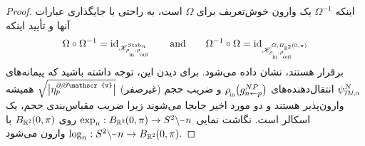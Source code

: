 \begin{proof}
    اینکه $\Omega^{-1}$ یک وارون خوش‌تعریف برای $\Omega$ است، به راحتی با جایگذاری عبارات آنها و تأیید اینکه
    \begin{align}
        \Omega \circ \Omega^{-1} = \id_{\mathscr{K}^{\Stab{n}}_{\rhoin\mkern-1mu,\rhoout}}
        \qquad \textup{and} \qquad
        \Omega^{-1} \circ \Omega = \id_{\mathscr{K}^{G,B_{\R^2}\mkern-1mu(0,\pi)}_{\rhoin\mkern-1mu,\rhoout}}
    \end{align}
    برقرار هستند، نشان داده می‌شود.
    برای دیدن این، توجه داشته باشید که پیمانه‌های $\psiTMn^N$ انتقال‌دهنده‌های $\rhoin\big( g_{n\leftarrow p}^{NP} \big)$ و ضریب حجم (غیرصفر) $\sqrt{\big|\eta_p^{\partial\mkern-2mu/\mkern-2mu\partial\mathscr{v}}\big|}$ همیشه وارون‌پذیر هستند و دو مورد اخیر جابجا می‌شوند زیرا ضریب مقیاس‌بندی حجم، یک اسکالر است.
    نگاشت نمایی $\exp_n: B_{\R^2}\mkern-1mu(0,\pi) \to S^2 \backslash \mkern-1mu\minus\mkern1mu n$ روی $B_{\mathbb{R}^2}\mkern-1mu(0,\pi)$ با $\log_n: S^2 \backslash \mkern-1mu\minus\mkern1mu n \to B_{\R^2}\mkern-1mu(0,\pi)$ وارون می‌شود.



\end{proof}
